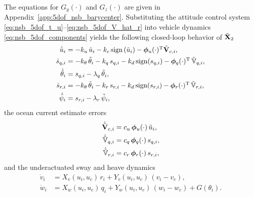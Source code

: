 \noindent The equations for $G_y(\cdot)$ and $G_z(\cdot)$ are given in Appendix~\ref{app:5dof_nsb_barycenter}.
Substituting the attitude control system \eqref{eq:nsb_5dof_t_u}--\eqref{eq:nsb_5dof_V_hat_r} into vehicle dynamics \eqref{eq:nsb_5dof_components} yields the following closed-loop behavior of $\tilde{\mathbf{X}}_2$
\begin{subequations}
    \begin{align}
        \scale[0.97]{\dot{\tilde{u}}_i} &= \scale[0.97]{- k_u\,\tilde{u}_i - k_c\,{\rm sign}\left(\tilde{u}_i\right) - \bs{\phi}_u(\cdot)\T\tilde{\mat{V}}_{c,i},} \label{eq:nsb_5dof_u_tilde} \\
        \scale[0.97]{\dot{s}_{q,i}} &= \scale[0.97]{-k_{\theta}\,\tilde{\theta}_i - k_q\,s_{q,i} - k_d\,{\rm sign}(s_{q,i}) - \bs{\phi}_q(\cdot)\T\,\tilde{\mathbb{V}}_{q,i}, }\\
        \scale[0.97]{\dot{\tilde{\theta}}_i} &= \scale[0.97]{s_{q,i} - \lambda_q\,\tilde{\theta}_i,} \\
        \scale[0.97]{\dot{s}_{r,i}} &= \scale[0.97]{-k_{\theta}\,\tilde{\theta}_i - k_r\,s_{r,i} - k_d\,{\rm sign}(s_{r,i}) - \bs{\phi}_r(\cdot)\T\,\tilde{\mathbb{V}}_{r,i},} \\
        \scale[0.97]{\dot{\tilde{\psi}}_i} &= \scale[0.97]{s_{r,i} - \lambda_r\,\tilde{\psi}_i,} \label{eq:nsb_5dof_psi_tilde}
    \end{align} \label{eq:nsb_5dof_perturbing}
\end{subequations}
the ocean current estimate errors
\begin{subequations}
    \begin{align}
        \dot{\tilde{\mathbf{V}}}_{c,i} & = c_u\,\bm{\phi}_u(\cdot)\,\tilde{u}_i, \label{eq:nsb_5dof_V_c_tilde} \\
        \dot{\tilde{\mathbb{V}}}_{q,i} &= c_q\,\bm{\phi}_q(\cdot)\,s_{q,i}, \\
        \dot{\tilde{\mathbb{V}}}_{r,i} &= c_r\,\bm{\phi}_r(\cdot)\,s_{r,i}, \label{eq:nsb_5dof_theta_r_tilde}
    \end{align} \label{eq:nsb_5dof_estimates}
\end{subequations}
and the underactuated sway and heave dynamics
\begin{align}
    \dot{v}_i &= X_v(u_i, u_c)\,r_i + Y_v(u_i, u_c)\,(v_i - v_c), \label{eq:nsb_5dof_v_dot} \\
    \dot{w}_i &= X_w(u_i, u_c)\,q_i + Y_w(u_i, u_c)\,(w_i - w_c) + G(\theta_i). \label{eq:nsb_5dof_w_dot}
\end{align}

